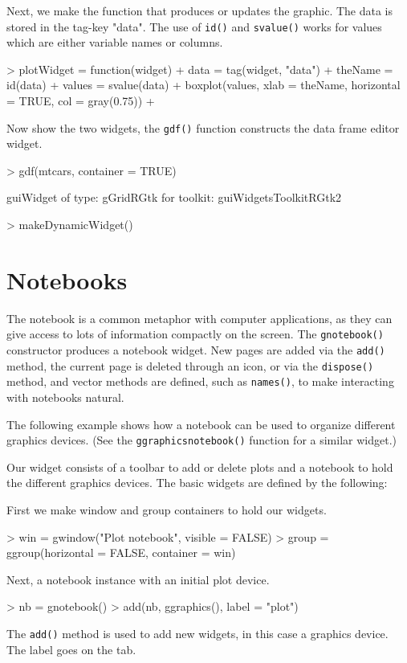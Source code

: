 \documentclass[12pt]{article}
\newcommand{\RFunc}[1]{\texttt{#1()}}
\begin{document}
Next, we make the function that produces or updates the graphic. The
data is stored in the tag-key "data". The use of \RFunc{id} and
\RFunc{svalue} works for values which are either variable names or columns.

\begin{Schunk}
\begin{Sinput}
> plotWidget = function(widget) {
+     data = tag(widget, "data")
+     theName = id(data)
+     values = svalue(data)
+     boxplot(values, xlab = theName, horizontal = TRUE, col = gray(0.75))
+ }
\end{Sinput}
\end{Schunk}

Now show the two widgets, the \RFunc{gdf} function constructs the data
frame editor widget.
\begin{Schunk}
\begin{Sinput}
> gdf(mtcars, container = TRUE)
\end{Sinput}
\begin{Soutput}
guiWidget of type: gGridRGtk for toolkit: guiWidgetsToolkitRGtk2 
\end{Soutput}
\begin{Sinput}
> makeDynamicWidget()
\end{Sinput}
\end{Schunk}


\section{Notebooks}

The notebook is a common metaphor with computer applications, as they
can give access to lots of information compactly on the screen. The
\RFunc{gnotebook} constructor produces a notebook
widget. New pages are added via the \RFunc{add} method, the current
page is deleted through an icon, or via the \RFunc{dispose} method,
and vector methods are defined, such as \RFunc{names}, to make
interacting with notebooks natural.

The following example shows how a notebook can be used to organize
different graphics devices. (See the \RFunc{ggraphicsnotebook} function
for a similar widget.)

Our widget consists of a toolbar to add or delete plots and a notebook
to hold the different graphics devices. The basic widgets are defined
by the following:

First we make window and group containers to hold our widgets.
\begin{Schunk}
\begin{Sinput}
> win = gwindow("Plot notebook", visible = FALSE)
> group = ggroup(horizontal = FALSE, container = win)
\end{Sinput}
\end{Schunk}
Next, a notebook instance with an initial plot device.
\begin{Schunk}
\begin{Sinput}
> nb = gnotebook()
> add(nb, ggraphics(), label = "plot")
\end{Sinput}
\end{Schunk}
The \RFunc{add} method is used to add new widgets, in this case a
graphics device. The label goes on the tab.
\end{document}
